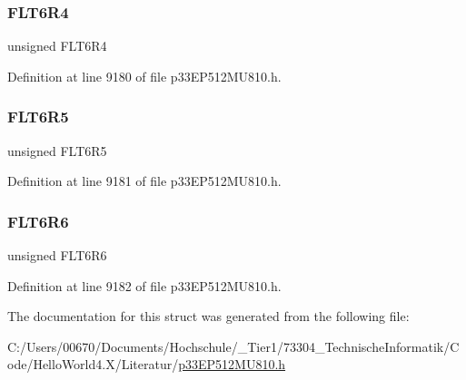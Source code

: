 \subsubsection{\texorpdfstring{F\+L\+T6\+R4}{FLT6R4}}
{\footnotesize\ttfamily unsigned F\+L\+T6\+R4}



Definition at line 9180 of file p33\+E\+P512\+M\+U810.\+h.

\mbox{\label{structtag_r_p_i_n_r42_b_i_t_s_a0e4d9f63b476c7b982f3971b6e21b6f9}} 
\subsubsection{\texorpdfstring{F\+L\+T6\+R5}{FLT6R5}}
{\footnotesize\ttfamily unsigned F\+L\+T6\+R5}



Definition at line 9181 of file p33\+E\+P512\+M\+U810.\+h.

\mbox{\label{structtag_r_p_i_n_r42_b_i_t_s_aae8e6609d5c855261ccb8e6232d12195}} 
\subsubsection{\texorpdfstring{F\+L\+T6\+R6}{FLT6R6}}
{\footnotesize\ttfamily unsigned F\+L\+T6\+R6}



Definition at line 9182 of file p33\+E\+P512\+M\+U810.\+h.



The documentation for this struct was generated from the following file\+:\begin{DoxyCompactItemize}
\item 
C\+:/\+Users/00670/\+Documents/\+Hochschule/\+\_\+\+Tier1/73304\+\_\+\+Technische\+Informatik/\+Code/\+Hello\+World4.\+X/\+Literatur/\hyperlink{p33_e_p512_m_u810_8h}{p33\+E\+P512\+M\+U810.\+h}\end{DoxyCompactItemize}
